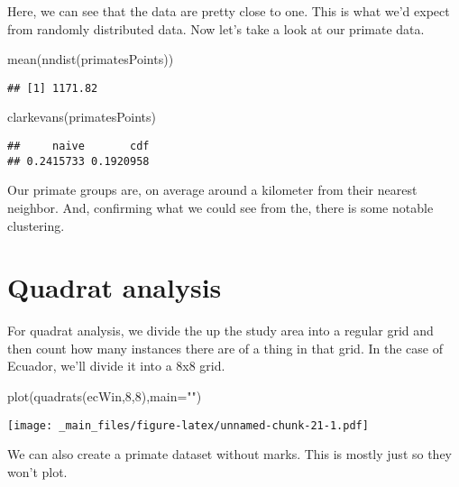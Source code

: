 \documentclass[
]{book}
\newenvironment{Shaded}{\begin{snugshade}}{\end{snugshade}}
\newcommand{\AttributeTok}[1]{\textcolor[rgb]{0.77,0.63,0.00}{#1}}
\newcommand{\DecValTok}[1]{\textcolor[rgb]{0.00,0.00,0.81}{#1}}
\newcommand{\FunctionTok}[1]{\textcolor[rgb]{0.00,0.00,0.00}{#1}}
\newcommand{\NormalTok}[1]{#1}
\newcommand{\StringTok}[1]{\textcolor[rgb]{0.31,0.60,0.02}{#1}}
\begin{document}
Here, we can see that the data are pretty close to one. This is what we'd expect from randomly distributed data. Now let's take a look at our primate data.

\begin{Shaded}
\begin{Highlighting}[]
\FunctionTok{mean}\NormalTok{(}\FunctionTok{nndist}\NormalTok{(primatesPoints))}
\end{Highlighting}
\end{Shaded}

\begin{verbatim}
## [1] 1171.82
\end{verbatim}

\begin{Shaded}
\begin{Highlighting}[]
\FunctionTok{clarkevans}\NormalTok{(primatesPoints)}
\end{Highlighting}
\end{Shaded}

\begin{verbatim}
##     naive       cdf 
## 0.2415733 0.1920958
\end{verbatim}

Our primate groups are, on average around a kilometer from their nearest neighbor. And, confirming what we could see from the, there is some notable clustering.

\hypertarget{quadrat-analysis}{%
\chapter{Quadrat analysis}\label{quadrat-analysis}}

For quadrat analysis, we divide the up the study area into a regular grid and then count how many instances there are of a thing in that grid. In the case of Ecuador, we'll divide it into a 8x8 grid.

\begin{Shaded}
\begin{Highlighting}[]
\FunctionTok{plot}\NormalTok{(}\FunctionTok{quadrats}\NormalTok{(ecWin,}\DecValTok{8}\NormalTok{,}\DecValTok{8}\NormalTok{),}\AttributeTok{main=}\StringTok{""}\NormalTok{)}
\end{Highlighting}
\end{Shaded}

\texttt{[image: \_main\_files/figure-latex/unnamed-chunk-21-1.pdf]}

We can also create a primate dataset without marks. This is mostly just so they won't plot.
\end{document}
